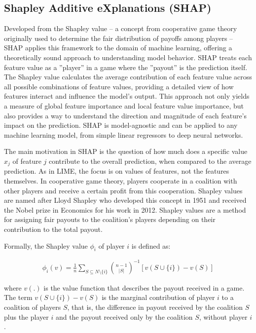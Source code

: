 \subsection{Shapley Additive eXplanations (SHAP)}

Developed from the Shapley value -- a concept from cooperative game theory originally used to determine the fair distribution of payoffs among players -- SHAP applies this framework to the domain of machine learning, offering a theoretically sound approach to understanding model behavior. SHAP treats each feature value as a ''player'' in a game where the ''payout'' is the prediction itself. The Shapley value calculates the average contribution of each feature value across all possible combinations of feature values, providing a detailed view of how features interact and influence the model's output. This approach not only yields a measure of global feature importance and local feature value importance, but also provides a way to understand the direction and magnitude of each feature's impact on the prediction. SHAP is model-agnostic and can be applied to any machine learning model, from simple linear regressors to deep neural networks. 

The main motivation in SHAP is the question of how much does a specific value $x_j$ of feature $j$ contribute to the overall prediction, when compared to the average prediction. As in LIME, the focus is on values of features, not the features themselves. In cooperative game theory, players cooperate in a coalition with other players and receive a certain profit from this cooperation. Shapley values are named after Lloyd Shapley who developed this concept in 1951 and received the Nobel prize in Economics for his work in 2012. Shapley values are a method for assigning fair payouts to the coalition's players depending on their contribution to the total payout. 

Formally, the Shapley value $\phi_i$ of player $i$ is defined as:

\begin{align*}
\phi_i(v) = \frac{1}{n} \sum_{S \subseteq N \setminus \{i\}} \binom{n-1}{|S|}^{-1} \left[ v(S \cup \{i\}) - v(S)\right]
\end{align*}

where $v(.)$ is the value function that describes the payout received in a game. The term $v(S \cup \{i\}) - v(S)$ is the marginal contribution of player $i$ to a coalition of players $S$, that is, the difference in payout received by the coalition $S$ plus the player $i$ and the payout received only by the coalition $S$, without player $i$. 

